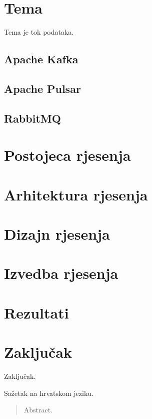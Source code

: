 \documentclass[times, utf8, diplomski, numeric]{fer}
\begin{document}
\chapter{Tema}
Tema je tok podataka.



\section{Apache Kafka}

\section{Apache Pulsar}

\section{RabbitMQ}

\chapter{Postojeca rjesenja}

\chapter{Arhitektura rjesenja}

\chapter{Dizajn rjesenja}

\chapter{Izvedba rjesenja}

\chapter{Rezultati}

\chapter{Zaključak}
Zaključak.




\begin{sazetak}
Sažetak na hrvatskom jeziku.

\end{sazetak}

\begin{abstract}
Abstract.

\end{abstract}
\end{document}
